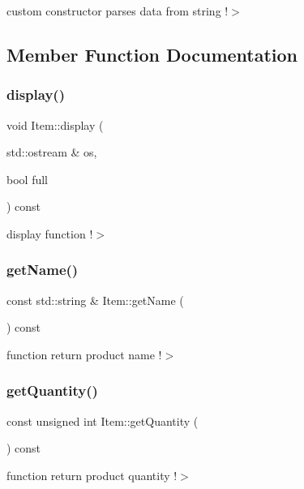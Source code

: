 custom constructor parses data from string !$>$ 

\subsection{Member Function Documentation}
\mbox{\label{class_item_a41852668dc58d933f786007835dbd8b5}} 
\subsubsection{\texorpdfstring{display()}{display()}}
{\footnotesize\ttfamily void Item\+::display (\begin{DoxyParamCaption}\item[{std\+::ostream \&}]{os,  }\item[{bool}]{full }\end{DoxyParamCaption}) const}

display function !$>$ \mbox{\label{class_item_a906722df9ab3f424d32c4106ff64aa15}} 
\subsubsection{\texorpdfstring{get\+Name()}{getName()}}
{\footnotesize\ttfamily const std\+::string \& Item\+::get\+Name (\begin{DoxyParamCaption}{ }\end{DoxyParamCaption}) const}

function return product name !$>$ \mbox{\label{class_item_ad4d1e93eb012fb0124fa274284fb415c}} 
\subsubsection{\texorpdfstring{get\+Quantity()}{getQuantity()}}
{\footnotesize\ttfamily const unsigned int Item\+::get\+Quantity (\begin{DoxyParamCaption}{ }\end{DoxyParamCaption}) const}

function return product quantity !$>$ \mbox{\label{class_item_a73bb3db4f7f0c571d6527d70875db284}} 
